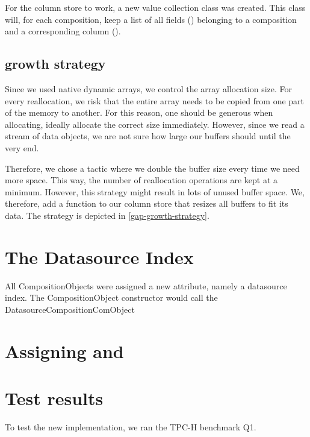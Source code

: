 For the column store to work, a new value collection class was created. This class will, for each composition, keep a list of all fields () belonging to a composition and a corresponding column ().

\subsection{ growth strategy}
\label{sub:FieldValueCollection growth strategy}
Since we used native dynamic arrays, we control the array allocation size. For every reallocation, we risk that the entire array needs to be copied from one part of the memory to another. For this reason, one should be generous when allocating, ideally allocate the correct size immediately. However, since we read a stream of data objects, we are not sure how large our buffers should until the very end. 

Therefore, we chose a tactic where we double the buffer size every time we need more space. This way, the number of reallocation operations are kept at a minimum. However, this strategy might result in lots of unused buffer space. We, therefore, add a  function to our column store that resizes all buffers to fit its data. The strategy is depicted in \ref{gap-growth-strategy}.


\section{The Datasource Index}
\label{sec:The Datasource Index}
All CompositionObjects were assigned a new attribute, namely a datasource index. The CompositionObject constructor would call the DatasourceCompositionComObject

\section{Assigning and }
\label{sec:Assigning and }

\section{Test results}
\label{sec:Test results}
To test the new implementation, we ran the TPC-H benchmark Q1.

